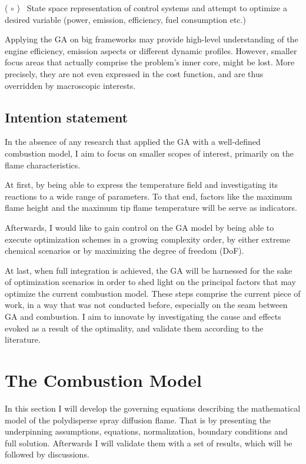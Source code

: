 \documentclass[12pt]{article}
\numberwithin{equation}{section}
\begin{document}
\begin{flushleft}
( $ \circ $ ) \ State space representation of control systems and attempt to optimize a desired variable (power, emission, efficiency, fuel consumption etc.)

Applying the GA on big frameworks may provide high-level understanding of the engine efficiency, emission aspects or different dynamic profiles. However, smaller focus areas that actually comprise the problem's inner core, might be lost. More precisely, they are not even expressed in the cost function, and are thus overridden by macroscopic interests.

\subsection{Intention statement}

In the absence of any research that applied the GA with a well-defined combustion model, I aim to focus on smaller scopes of interest, primarily on the flame characteristics. 

At first, by being able to express the temperature field and investigating its reactions to a wide range of parameters. To that end, factors like the maximum flame height and the maximum tip flame temperature will be serve as indicators.

Afterwards, I would like to gain control on the GA model by being able to execute optimization schemes in a growing complexity order, by either extreme chemical scenarios or by maximizing the degree of freedom (DoF).

At last, when full integration is achieved, the GA will be harnessed for the sake of optimization scenarios in order to shed light on the principal factors that may optimize the current combustion model. These steps comprise the current piece of work, in a way that was not conducted before, especially on the seam between GA and combustion. 
I aim to innovate by investigating the cause and effects evoked as a result of the optimality, and validate them according to the literature.

\newpage

\section{The Combustion Model}
In this section I will develop the governing equations describing the mathematical model of the polydisperse spray diffusion flame. That is by presenting the underpinning assumptions, equations, normalization, boundary conditions and full solution. Afterwards I will validate them with a set of results, which will be followed by discussions.  %



\end{flushleft}
\end{document}
